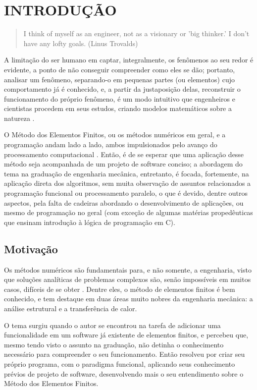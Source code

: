 

\chapter{INTRODUÇÃO}

\begin{quote}
    I think of myself as an engineer, not as a visionary or 'big thinker.' I don't have any lofty goals.
    (Linus Trovalds)  
\end{quote}

A limitação do ser humano em captar, integralmente, os fenômenos ao seu redor é evidente, a ponto de não conseguir compreender como eles se dão; portanto, analisar um fenômeno, separando-o em pequenas partes (ou elementos) cujo comportamento já é conhecido, e, a partir da justaposição delas, reconstruir o funcionamento do próprio fenômeno, é um modo intuitivo que engenheiros e cientistas procedem em seus estudos, criando modelos matemáticos sobre a natureza \cite{Zin}.


O Método dos Elementos Finitos, ou os métodos numéricos em geral, e a programação andam lado a lado, ambos impulsionados pelo avanço do processamento computacional \cite{Onate}. Então, é de se esperar que uma aplicação desse método seja acompanhada de um projeto de software conciso; a abordagem do tema na graduação de engenharia mecânica, entretanto, é focada, fortemente, na aplicação direta dos algoritmos, sem muita observação de assuntos relacionados a programação funcional ou processamento paralelo, o que é devido, dentre outros aspectos, pela falta de cadeiras abordando o desenvolvimento de aplicações, ou mesmo de programação no geral (com exceção de algumas matérias propedêuticas que ensinam introdução à lógica de programação em C).

\section{Motivação}

Os métodos numéricos são fundamentais para, e não somente, a engenharia, visto que soluções analíticas de problemas complexos são, senão impossíveis em muitos casos, difíceis de se obter \cite{Onate}. Dentre eles, o método de elementos finitos é bem conhecido, e tem destaque em duas áreas muito nobres da engenharia mecânica: a análise estrutural e a transferência de calor.

O tema surgiu quando o autor se encontrou na tarefa de adicionar uma funcionalidade em um software já existente de elementos finitos, e percebeu que, mesmo tendo visto o assunto na graduação, não detinha o conhecimento necessário para compreender o seu funcionamento. Então resolveu por criar seu próprio programa, com o paradigma funcional, aplicando seus conhecimento prévios de projeto de software, desenvolvendo mais o seu entendimento sobre o Método dos Elementos Finitos.


